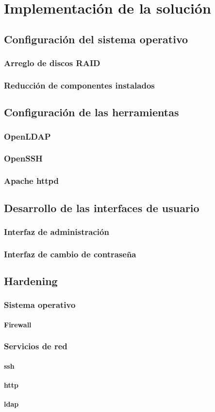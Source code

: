   \label{chap:cap3}
  \chapter {Implementaci\'{o}n de la soluci\'{o}n}
    \section {Configuraci\'{o}n del sistema operativo}
      \subsection {Arreglo de discos RAID}
      \subsection {Reducci\'{o}n de componentes instalados}
    \section {Configuraci\'{o}n de las herramientas}
      \subsection {OpenLDAP}
      \subsection {OpenSSH}
      \subsection {Apache httpd}
    \section {Desarrollo de las interfaces de usuario}
      \subsection {Interfaz de administraci\'{o}n}
      \subsection {Interfaz de cambio de contrase\~{n}a}
    \section {Hardening}
      \subsection {Sistema operativo}
        \subsubsection {Firewall}
      \subsection {Servicios de red}
        \subsubsection {ssh}
        \subsubsection {http}
        \subsubsection {ldap}

